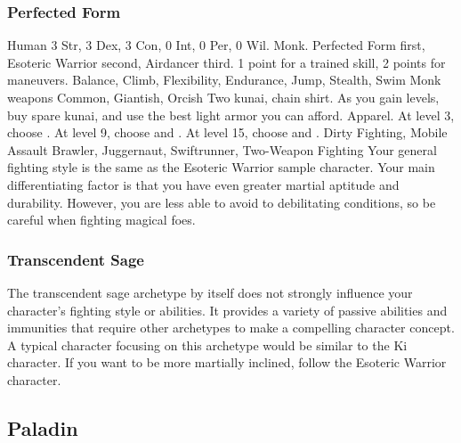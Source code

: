         \subsubsection{Perfected Form}
             Human
             3 Str, 3 Dex, 3 Con, 0 Int, 0 Per, 0 Wil.
             Monk.
             Perfected Form first, Esoteric Warrior second, Airdancer third.
             1 point for a trained skill, 2 points for maneuvers.
             Balance, Climb, Flexibility, Endurance, Jump, Stealth, Swim
             Monk weapons
             Common, Giantish, Orcish
             Two kunai, chain shirt. As you gain levels, buy spare kunai, and use the best light armor you can afford.
             Apparel.
                At level 3, choose .
                At level 9, choose  and .
                At level 15, choose  and .
             Dirty Fighting, Mobile Assault
             Brawler, Juggernaut, Swiftrunner, Two-Weapon Fighting
             Your general fighting style is the same as the Esoteric Warrior sample character.
            Your main differentiating factor is that you have even greater martial aptitude and durability.
            However, you are less able to avoid to debilitating conditions, so be careful when fighting magical foes.

        \subsubsection{Transcendent Sage}
            The transcendent sage archetype by itself does not strongly influence your character's fighting style or abilities.
            It provides a variety of passive abilities and immunities that require other archetypes to make a compelling character concept.
            A typical character focusing on this archetype would be similar to the Ki character.
            If you want to be more martially inclined, follow the Esoteric Warrior character.

    \subsection{Paladin}

